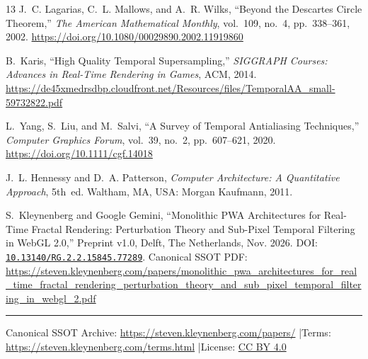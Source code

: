 \documentclass[11pt, a4paper]{article}
\begin{document}
\begin{thebibliography}{13}
J.~C. Lagarias, C.~L. Mallows, and A.~R. Wilks, ``Beyond the Descartes Circle Theorem,'' \emph{The American Mathematical Monthly}, vol.~109, no.~4, pp.~338--361, 2002. \url{https://doi.org/10.1080/00029890.2002.11919860}

B.~Karis, ``High Quality Temporal Supersampling,'' \emph{SIGGRAPH Courses: Advances in Real-Time Rendering in Games}, ACM, 2014. \url{https://de45xmedrsdbp.cloudfront.net/Resources/files/TemporalAA_small-59732822.pdf}

L.~Yang, S.~Liu, and M.~Salvi, ``A Survey of Temporal Antialiasing Techniques,'' \emph{Computer Graphics Forum}, vol.~39, no.~2, pp.~607--621, 2020. \url{https://doi.org/10.1111/cgf.14018}

J.~L. Hennessy and D.~A. Patterson, \emph{Computer Architecture: A Quantitative Approach}, 5th~ed. Waltham, MA, USA: Morgan Kaufmann, 2011.

S.~Kleynenberg and Google Gemini, ``Monolithic PWA Architectures for Real-Time Fractal Rendering: Perturbation Theory and Sub-Pixel Temporal Filtering in WebGL 2.0,'' Preprint v1.0, Delft, The Netherlands, Nov. 2026. DOI: \href{https://doi.org/10.13140/RG.2.2.15845.77289}{\texttt{10.13140/RG.2.2.15845.77289}}. Canonical SSOT PDF: \url{https://steven.kleynenberg.com/papers/monolithic_pwa_architectures_for_real_time_fractal_rendering_perturbation_theory_and_sub_pixel_temporal_filtering_in_webgl_2.pdf}

\end{thebibliography}

\vspace{0.8em}
\noindent\rule{\textwidth}{0.5pt}
{\small\textcolor{muted}{Canonical SSOT Archive: \url{https://steven.kleynenberg.com/papers/} \quad|\quad Terms: \url{https://steven.kleynenberg.com/terms.html} \quad|\quad License: \href{https://creativecommons.org/licenses/by/4.0/}{CC BY 4.0}}}
\end{document}
